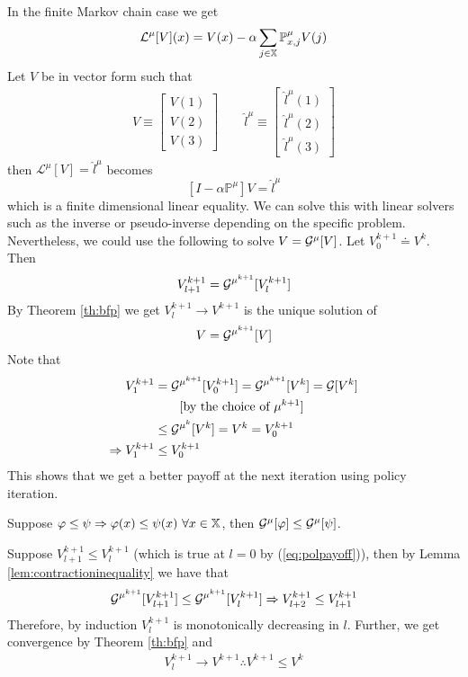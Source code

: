 In the finite Markov chain case we get
$$\mathcal{L}^\mu[V](x) = V(x)-\alpha\sum_{j\in\mathbb{X}}\mathbb{P}_{x,j}^\mu V(j)$$
Let $V$ be in vector form such that
\begin{align*}
V\equiv\left[\begin{array}{c} V(1) \\ V(2) \\ V(3) \end{array}\right]
\qquad \hat{l}^\mu\equiv \left[\begin{array}{c} \hat{l}^\mu(1) \\ \hat{l}^\mu(2) \\ \hat{l}^\mu(3) \end{array}\right]
\end{align*}
then $\mathcal{L}^\mu[V]=\hat{l}^\mu$ becomes
$$\left[I-\alpha\mathbb{P}^\mu\right]V=\hat{l}^\mu$$
which is a finite dimensional linear equality. We can solve this with linear solvers such as the inverse or pseudo-inverse depending on the specific problem. Nevertheless, we could use the following to solve $V=\mathcal{G}^\mu[V]$. Let $V_0^{k+1}\doteq V^k$. Then
$$V_{l+1}^{k+1}=\mathcal{G}^{\mu^{k+1}}[V_l^{k+1}]$$
By Theorem \ref{th:bfp} we get $V_l^{k+1}\to V^{k+1}$ is the unique solution of
$$V=\mathcal{G}^{\mu^{k+1}}[V]$$
Note that
\begin{align}
\label{eq:polpayoff}
V_1^{k+1} &= \mathcal{G}^{\mu^{k+1}}[V_0^{k+1}] = \mathcal{G}^{\mu^{k+1}}[V^k] = \mathcal{G}[V^k] \nonumber \\
&\qquad[\text{by the choice of } \mu^{k+1}] \nonumber \\
&\leq \mathcal{G}^{\mu^k}[V^k] = V^k = V_0^{k+1} \nonumber \\
\Rightarrow V_1^{k+1} &\leq V_0^{k+1}
\end{align}
This shows that we get a better payoff at the next iteration using policy iteration.

\begin{lemma}
\label{lem:contractioninequality}
Suppose $\varphi\leq\psi \Rightarrow \varphi(x)\leq\psi(x) ~\forall x\in\mathbb{X}$, then $\mathcal{G}^\mu[\varphi]\leq\mathcal{G}^\mu[\psi]$.
\end{lemma}

Suppose $V_{l+1}^{k+1}\leq V_l^{k+1}$ (which is true at $l=0$ by (\ref{eq:polpayoff})), then by Lemma \ref{lem:contractioninequality} we have that
$$\mathcal{G}^{\mu^{k+1}}[V_{l+1}^{k+1}]\leq\mathcal{G}^{\mu^{k+1}}[V_l^{k+1}] \Rightarrow V_{l+2}^{k+1}\leq V_{l+1}^{k+1}$$
Therefore, by induction $V_l^{k+1}$ is monotonically decreasing in $l$. Further, we get convergence by Theorem \ref{th:bfp} and
\begin{align}
\label{eq:vmonotonic}
V_l^{k+1}\to V^{k+1} \therefore V^{k+1}\leq V^k
\end{align}

